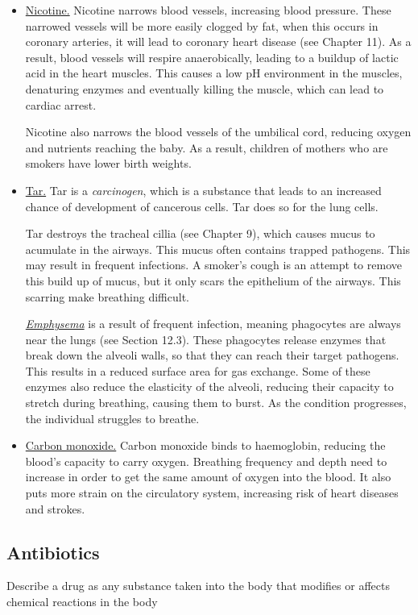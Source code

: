 \begin{itemize}
\item\ul{Nicotine.} Nicotine narrows blood vessels, increasing blood pressure. These
	narrowed vessels will be more easily clogged by fat, when this occurs in coronary arteries,
	it will lead to coronary heart disease (see Chapter 11). As a result, blood vessels will
	respire anaerobically, leading to a buildup of lactic acid in the heart muscles. This causes
	a low pH environment in the muscles, denaturing enzymes and eventually killing the muscle,
	which can lead to cardiac arrest. 

	Nicotine also narrows the blood vessels of the umbilical cord, reducing oxygen and nutrients
	reaching the baby. As a result, children of mothers who are smokers have lower birth weights.

\item\ul{Tar.} Tar is a \emph{carcinogen}, which is a substance that leads to an increased
	chance of development of cancerous cells. Tar does so for the lung cells.

	Tar destroys the tracheal cillia (see Chapter 9), which causes mucus to acumulate in the
	airways. This mucus often contains trapped pathogens. This may result in frequent infections.
	A smoker's cough is an attempt to remove this build up of mucus, but it only scars the
	epithelium of the airways. This scarring make breathing difficult.

	\ul{\emph{Emphysema}} is a result of frequent infection, meaning phagocytes are always near the lungs
	(see Section 12.3). These phagocytes release enzymes that break down the alveoli walls, 
	so that they can reach their target pathogens. This results in a reduced surface area for
	gas exchange. Some of these enzymes also reduce the elasticity of the alveoli, reducing their
	capacity to stretch during breathing, causing them to burst. As the condition progresses, the
	individual struggles to breathe.

\item\ul{Carbon monoxide.} Carbon monoxide binds to haemoglobin, reducing the blood's 
	capacity to carry oxygen. Breathing frequency and depth need to increase in order to get the
	same amount of oxygen into the blood. It also puts more strain on the circulatory system,
	increasing risk of heart diseases and strokes.
\end{itemize}

\subsection{Antibiotics}
\begin{point}
Describe a drug as any substance taken into the body that modifies or affects chemical reactions in the 
body
\end{point}

